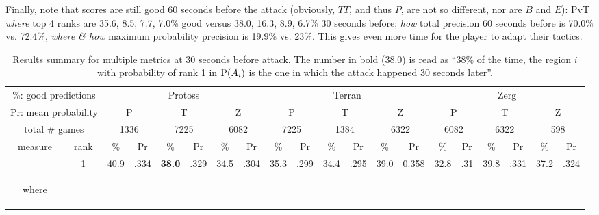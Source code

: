 Finally, note that scores are still good 60 seconds before the attack (obviously, $TT$, and thus $P$, are not so different, nor are $B$ and $E$): PvT \textit{where} top 4 ranks are 35.6, 8.5, 7.7, 7.0\% good versus 38.0, 16.3, 8.9, 6.7\% 30 seconds before; \textit{how} total precision 60 seconds before is 70.0\% vs. 72.4\%, \textit{where \& how} maximum probability precision is 19.9\% vs. 23\%. This gives even more time for the player to adapt their tactics.

\setlength{\tabcolsep}{4.69pt}
\begin{table}
\caption{Results summary for multiple metrics at 30 seconds before attack. The number in bold (38.0) is read as ``38\% of the time, the region $i$ with probability of rank 1 in $\mathrm{P}(A_i)$ is the one in which the attack happened 30 seconds later''.}
\begin{center}
\begin{footnotesize}
\begin{tabular}{|cc|cc|cc|cc|cc|cc|cc|cc|cc|cc|}
\hline
\multicolumn{2}{|c|}{\%: good predictions} & \multicolumn{6}{||c|}{Protoss} & \multicolumn{6}{|c|}{Terran} & \multicolumn{6}{|c|}{Zerg} \\
\multicolumn{2}{|c|}{Pr: mean probability} & \multicolumn{2}{||c|}{P} & \multicolumn{2}{|c|}{T} & \multicolumn{2}{|c|}{Z} & \multicolumn{2}{|c|}{P} & \multicolumn{2}{|c|}{T} & \multicolumn{2}{|c|}{Z} & \multicolumn{2}{|c|}{P} & \multicolumn{2}{|c|}{T} & \multicolumn{2}{|c|}{Z} \\
\hline
\multicolumn{2}{|c|}{total \# games} & \multicolumn{2}{|c|}{1336} & \multicolumn{2}{|c|}{7225}& \multicolumn{2}{|c|}{6082}& \multicolumn{2}{|c|}{7225}& \multicolumn{2}{|c|}{1384}& \multicolumn{2}{|c|}{6322}& \multicolumn{2}{|c|}{6082}& \multicolumn{2}{|c|}{6322}& \multicolumn{2}{|c|}{598}\\
\hline
measure & rank & \% & Pr & \% & Pr & \% & Pr & \% & Pr & \% & Pr& \% & Pr& \% & Pr& \% & Pr& \% & Pr  \\
\hline
 & 1 & 40.9 & .334 & \textbf{38.0} & .329 & 34.5 & .304 & 35.3 & .299 & 34.4 & .295 & 39.0 & 0.358 & 32.8 & .31 & 39.8 & .331 & 37.2 & .324 \\
\multirow{3}{3mm}{\begin{sideways}\parbox{3mm}{\begin{small}where\end{small}}\end{sideways}}

\end{tabular}
\end{footnotesize}
\end{center}
\end{table}
